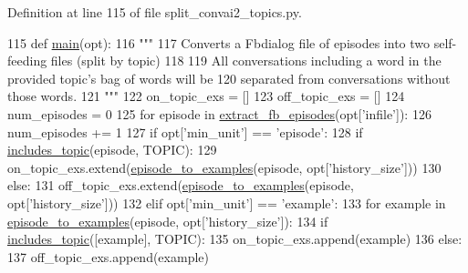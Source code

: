 Definition at line 115 of file split\+\_\+convai2\+\_\+topics.\+py.


\begin{DoxyCode}
115 \textcolor{keyword}{def }\hyperlink{namespaceprojects_1_1self__feeding_1_1scripts_1_1split__convai2__topics_ab05b7abb9e9f7c1778462fc1ac5345f1}{main}(opt):
116     \textcolor{stringliteral}{"""}
117 \textcolor{stringliteral}{    Converts a Fbdialog file of episodes into two self-feeding files (split by topic)}
118 \textcolor{stringliteral}{}
119 \textcolor{stringliteral}{    All conversations including a word in the provided topic's bag of words will be}
120 \textcolor{stringliteral}{    separated from conversations without those words.}
121 \textcolor{stringliteral}{    """}
122     on\_topic\_exs = []
123     off\_topic\_exs = []
124     num\_episodes = 0
125     \textcolor{keywordflow}{for} episode \textcolor{keywordflow}{in} \hyperlink{namespaceprojects_1_1self__feeding_1_1utils_a813014fa481008e57bf444f8a3f88d3e}{extract\_fb\_episodes}(opt[\textcolor{stringliteral}{'infile'}]):
126         num\_episodes += 1
127         \textcolor{keywordflow}{if} opt[\textcolor{stringliteral}{'min\_unit'}] == \textcolor{stringliteral}{'episode'}:
128             \textcolor{keywordflow}{if} \hyperlink{namespaceprojects_1_1self__feeding_1_1scripts_1_1split__convai2__topics_a273e2c722d60a60b074557be2a4a0714}{includes\_topic}(episode, TOPIC):
129                 on\_topic\_exs.extend(\hyperlink{namespaceprojects_1_1self__feeding_1_1utils_a4523d4a7c4da698dda134e32acebe320}{episode\_to\_examples}(episode, opt[\textcolor{stringliteral}{'history\_size'}]))
130             \textcolor{keywordflow}{else}:
131                 off\_topic\_exs.extend(\hyperlink{namespaceprojects_1_1self__feeding_1_1utils_a4523d4a7c4da698dda134e32acebe320}{episode\_to\_examples}(episode, opt[\textcolor{stringliteral}{'history\_size'}]))
132         \textcolor{keywordflow}{elif} opt[\textcolor{stringliteral}{'min\_unit'}] == \textcolor{stringliteral}{'example'}:
133             \textcolor{keywordflow}{for} example \textcolor{keywordflow}{in} \hyperlink{namespaceprojects_1_1self__feeding_1_1utils_a4523d4a7c4da698dda134e32acebe320}{episode\_to\_examples}(episode, opt[\textcolor{stringliteral}{'history\_size'}]):
134                 \textcolor{keywordflow}{if} \hyperlink{namespaceprojects_1_1self__feeding_1_1scripts_1_1split__convai2__topics_a273e2c722d60a60b074557be2a4a0714}{includes\_topic}([example], TOPIC):
135                     on\_topic\_exs.append(example)
136                 \textcolor{keywordflow}{else}:
137                     off\_topic\_exs.append(example)

\end{DoxyCode}
